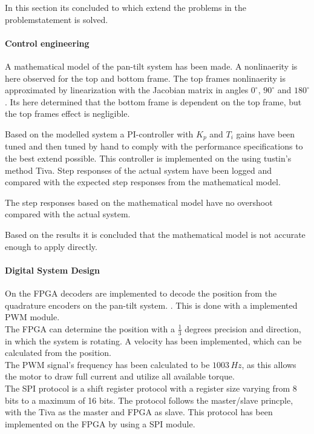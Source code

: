 \documentclass[../../main]{subfiles}
\begin{document}
In this section its concluded to which extend the problems in the problemstatement is solved.

\paragraph{Control engineering}
A mathematical model of the pan-tilt system has been made.
A nonlinaerity is here observed for the top and bottom frame. The top frames nonlinaerity is approximated by linearization with the Jacobian matrix in angles $0^\circ$, $90^\circ$ and $180^\circ$.
Its here determined that the bottom frame is dependent on the top frame, but the top frames effect is negligible.

Based on the modelled system a PI-controller with $K_p$ and $T_i$ gains have been tuned and then tuned by hand to comply with the performance specifications to the best extend possible.
This controller is implemented on the using tustin's method Tiva.
Step responses of the actual system have been logged and compared with the expected step responses from the mathematical model.

The step responses based on the mathematical model have no overshoot compared with the actual system.

Based on the results it is concluded that the mathematical model is not accurate enough to apply directly.\\

\paragraph{Digital System Design}
On the FPGA decoders are implemented to decode the position from the quadrature encoders on the pan-tilt system.
. This is done with a implemented PWM module.\\
The FPGA can determine the position with a $\frac{1}{3}$ degrees precision and direction, in which the system is rotating. A velocity has been implemented, which can be calculated from the position.\\
The PWM signal's frequency has been calculated to be $1003 \si{\,Hz}$, as this allows the motor to draw full current and utilize all available torque. \\
The SPI protocol is a shift register protocol with a register size varying from 8 bits to a maximum of 16 bits. The protocol follows the master/slave princple, with the Tiva as the master and FPGA as slave. This protocol has been implemented on the FPGA by using a SPI module.
\end{document}
